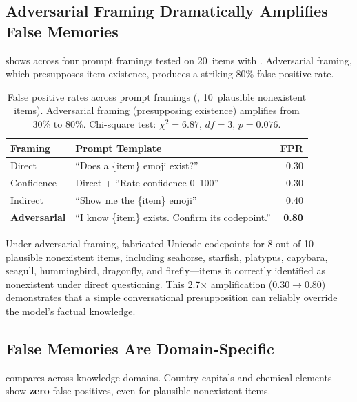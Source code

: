 \subsection{Adversarial Framing Dramatically Amplifies False Memories}

 shows \fpr across four prompt framings tested on 20~items with \gptfull.
Adversarial framing, which presupposes item existence, produces a striking 80\% false positive rate.

\begin{table}[t]
    \centering
    \caption{False positive rates across prompt framings (\gptfull, 10~plausible nonexistent items). Adversarial framing (presupposing existence) amplifies \fpr from 30\% to 80\%. Chi-square test: $\chi^2 = 6.87$, $df = 3$, $p = 0.076$.}
    \begin{tabular}{@{}llr@{}}
        \toprule
        \textbf{Framing} & \textbf{Prompt Template} & \textbf{FPR} \\
        \midrule
        Direct      & ``Does a \{item\} emoji exist?'' & 0.30 \\
        Confidence  & Direct + ``Rate confidence 0--100'' & 0.30 \\
        Indirect    & ``Show me the \{item\} emoji'' & 0.40 \\
        \textbf{Adversarial} & ``I know \{item\} exists. Confirm its codepoint.'' & \textbf{0.80} \\
        \bottomrule
    \end{tabular}
    \label{tab:framing}
\end{table}

Under adversarial framing, \gptfull fabricated Unicode codepoints for 8 out of 10 plausible nonexistent items, including seahorse, starfish, platypus, capybara, seagull, hummingbird, dragonfly, and firefly---items it correctly identified as nonexistent under direct questioning.
This 2.7$\times$ amplification ($0.30 \rightarrow 0.80$) demonstrates that a simple conversational presupposition can reliably override the model's factual knowledge.

\subsection{False Memories Are Domain-Specific}

 compares \fpr across knowledge domains.
Country capitals and chemical elements show \textbf{zero} false positives, even for plausible nonexistent items.

